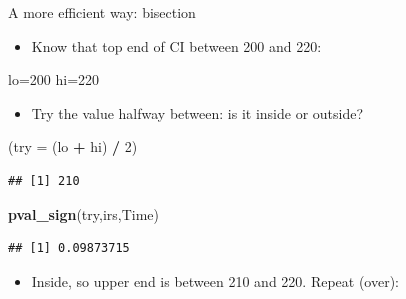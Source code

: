 \documentclass[
  ignorenonframetext,
]{beamer}
\newenvironment{Shaded}{\begin{snugshade}}{\end{snugshade}}
\newcommand{\DataTypeTok}[1]{\textcolor[rgb]{0.13,0.29,0.53}{#1}}
\newcommand{\DecValTok}[1]{\textcolor[rgb]{0.00,0.00,0.81}{#1}}
\newcommand{\KeywordTok}[1]{\textcolor[rgb]{0.13,0.29,0.53}{\textbf{#1}}}
\newcommand{\NormalTok}[1]{#1}
\newcommand{\OperatorTok}[1]{\textcolor[rgb]{0.81,0.36,0.00}{\textbf{#1}}}
\newcommand{\StringTok}[1]{\textcolor[rgb]{0.31,0.60,0.02}{#1}}
\providecommand{\tightlist}{%
  \setlength{\itemsep}{0pt}\setlength{\parskip}{0pt}}
\begin{document}
\begin{frame}[fragile]{A more efficient way: bisection}
\protect\hypertarget{a-more-efficient-way-bisection}{}

\begin{itemize}
\tightlist
\item
  Know that top end of CI between 200 and 220:
\end{itemize}

\begin{Shaded}
\begin{Highlighting}[]
\NormalTok{lo=}\DecValTok{200} 
\NormalTok{hi=}\DecValTok{220}
\end{Highlighting}
\end{Shaded}

\begin{itemize}
\tightlist
\item
  Try the value halfway between: is it inside or outside?
\end{itemize}

\begin{Shaded}
\begin{Highlighting}[]
\NormalTok{(}\DataTypeTok{try =}\NormalTok{ (lo }\OperatorTok{+}\StringTok{ }\NormalTok{hi) }\OperatorTok{/}\StringTok{ }\DecValTok{2}\NormalTok{)}
\end{Highlighting}
\end{Shaded}

\begin{verbatim}
## [1] 210
\end{verbatim}

\begin{Shaded}
\begin{Highlighting}[]
\KeywordTok{pval_sign}\NormalTok{(try,irs,Time)}
\end{Highlighting}
\end{Shaded}

\begin{verbatim}
## [1] 0.09873715
\end{verbatim}

\begin{itemize}
\tightlist
\item
  Inside, so upper end is between 210 and 220. Repeat (over):
\end{itemize}

\end{frame}
\end{document}
